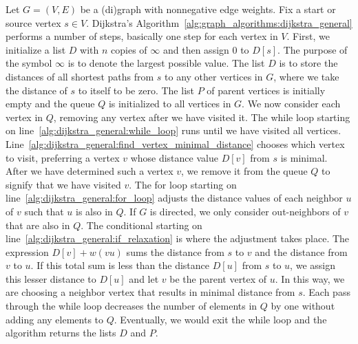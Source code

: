 Let $G = (V,E)$ be a (di)graph with nonnegative edge weights. Fix a
start or source vertex $s \in V$. Dijkstra's
Algorithm~\ref{alg:graph_algorithms:dijkstra_general} performs a
number of steps, basically one step for each vertex in $V$. First, we
initialize a list $D$ with $n$ copies of $\infty$ and then assign $0$
to $D[s]$. The purpose of the symbol $\infty$ is to denote the largest
possible value. The list $D$ is to store the distances of all shortest
paths from $s$ to any other vertices in $G$, where we take the
distance of $s$ to itself to be zero. The list $P$ of parent vertices
is initially empty and the queue $Q$ is initialized to all vertices in
$G$. We now consider each vertex in $Q$, removing any vertex after we
have visited it. The while loop starting on
line~\ref{alg:dijkstra_general:while_loop} runs until we have visited
all
vertices. Line~\ref{alg:dijkstra_general:find_vertex_minimal_distance}
chooses which vertex to visit, preferring a vertex $v$ whose distance
value $D[v]$ from $s$ is minimal. After we have determined such a
vertex $v$, we remove it from the queue $Q$ to signify that we have
visited $v$. The for loop starting on
line~\ref{alg:dijkstra_general:for_loop} adjusts the distance values
of each neighbor $u$ of $v$ such that $u$ is also in $Q$. If $G$ is
directed, we only consider out-neighbors of $v$ that are also in
$Q$. The conditional starting on
line~\ref{alg:dijkstra_general:if_relaxation} is where the adjustment
takes place. The expression $D[v] + w(vu)$ sums the distance from $s$
to $v$ and the distance from $v$ to $u$. If this total sum is less
than the distance $D[u]$ from $s$ to $u$, we assign this lesser
distance to $D[u]$ and let $v$ be the parent vertex of $u$. In this
way, we are choosing a neighbor vertex that results in minimal
distance from $s$. Each pass through the while loop decreases the
number of elements in $Q$ by one without adding any elements to
$Q$. Eventually, we would exit the while loop and the algorithm
returns the lists $D$ and $P$.

